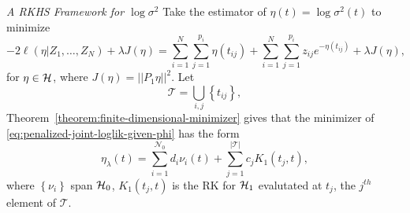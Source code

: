 \begin{frame}{\textit{A RKHS Framework for $\log \sigma^2$}}
\footnotesize
Take the estimator of $\eta\left(t\right) = \log\sigma^2\left(t\right)$ to minimize
\begin{equation} \label{eq:penalized-joint-loglik-given-phi}
-2\ell\left( \eta \vert Z_1,\dots, Z_N \right) +\lambda J \left(\eta\right) =  \sum_{i = 1}^N \sum_{j = 1}^{p_i} \eta\left(t_{ij}\right)  + \sum_{i = 1}^N \sum_{j = 1}^{p_i} z_{ij} e^{-\eta\left(t_{ij}\right)} + \lambda J\left(\eta\right),  
\end{equation}
\noindent
for $\eta \in \mathcal{H}$, where $J\left(\eta\right) =\vert \vert P_1 \eta \vert\vert^2$. Let 
 \[
 \mathcal{T} = \bigcup_{i,j} \left\{t_{ij}\right\},
 \]
 Theorem~\ref{theorem:finite-dimensional-minimizer} gives that the minimizer of \eqref{eq:penalized-joint-loglik-given-phi} has the form 
\begin{equation} \label{eq:form-of-smoothing-spline-solution-kappa}
\eta_\lambda\left( t \right) = \sum_{i = 1}^{\mathcal{N}_0} d_i \nu_i\left( t \right) + \sum_{j = 1}^{\vert \mathcal{T} \vert} c_j K_1\left(t_j,t\right),
\end{equation}  
\noindent
where $\left\{\nu_i \right\}$ span $\mathcal{H}_0$, $K_1\left(t_j,t\right)$ is the RK for $\mathcal{H}_1$ evalutated at ${t_j}$, the $j^{th}$ element of $\mathcal{T}$.

\end{frame}



%









